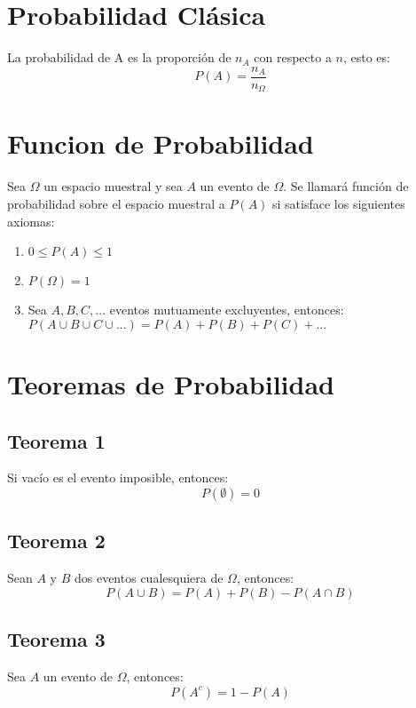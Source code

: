\documentclass{templateNote}
\begin{document}
\section{Probabilidad Clásica}
\indent
La probabilidad de A es la proporción de $n_A$ con respecto a $n$, esto es:
\begin{equation*}
    P(A) = \frac{n_A}{n_{\Omega}}
\end{equation*}

\newpage
\section{Funcion de Probabilidad}
\indent
Sea $\Omega$ un espacio muestral y sea $A$ un evento de $\Omega$. Se llamará función de
probabilidad sobre el espacio muestral a $P(A)$ si satisface los siguientes axiomas:
\begin{enumerate}
    \item $0 \leq P(A) \leq 1 $
    \item $P(\Omega) = 1 $
    \item Sea $A,B,C,...$ eventos mutuamente excluyentes, entonces: \newline
    $P(A \cup B \cup C \cup ...) = P(A) + P(B) + P(C) + ...$
\end{enumerate}

\section{Teoremas de Probabilidad}
\subsection{Teorema 1}
\indent
Si vacío es el evento imposible, entonces:
\begin{equation*}
    P(\emptyset) = 0
\end{equation*}

\subsection{Teorema 2}
\indent
Sean $A$ y $B$ dos eventos cualesquiera de $\Omega$, entonces:
\begin{equation*}
    P(A \cup B) = P(A) + P(B) - P(A \cap B)
\end{equation*}

\subsection{Teorema 3}
\indent
Sea $A$ un evento de $\Omega$, entonces:
\begin{equation*}
    P(A^c) = 1 - P(A)
\end{equation*}
\end{document}
